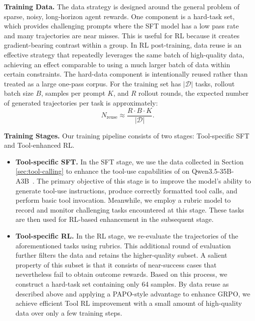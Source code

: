 \documentclass{llmxive}
\begin{document}
\textbf{Training Data.} The data strategy is designed around the general problem of sparse, noisy, long-horizon agent rewards. One component is a hard-task set, which provides challenging prompts where the SFT model has a low pass rate and many trajectories are near misses. This is useful for RL because it creates gradient-bearing contrast within a group. 
In RL post-training, data reuse is an effective strategy that repeatedly leverages the same batch of high-quality data, achieving an effect comparable to using a much larger batch of data within certain constraints. The hard-data component is intentionally reused rather than treated as a large one-pass corpus. For the training set has $|\mathcal{D}|$ tasks, rollout batch size $B$, samples per prompt $K$, and $R$ rollout rounds, the expected number of generated trajectories per task is approximately:
\begin{equation}
N_{\mathrm{reuse}}
\approx
\frac{R \cdot B \cdot K}{|\mathcal{D}|}.
\end{equation}

\textbf{Training Stages.} Our training pipeline consists of two stages: Tool-specific SFT and Tool-enhanced RL.
\begin{itemize}
    \item \textbf{Tool-specific SFT.} In the SFT stage, we use the data collected in Section \ref{sec:tool-calling} to enhance the tool-use capabilities of on Qwen3.5-35B-A3B~\citep{Qwen3.5}. The primary objective of this stage is to improve the model’s ability to generate tool-use instructions, produce correctly formatted tool calls, and perform basic tool invocation. Meanwhile, we employ a rubric model to record and monitor challenging tasks encountered at this stage. These tasks are then used for RL-based enhancement in the subsequent stage.
    \item \textbf{Tool-specific RL.} In the RL stage, we re-evaluate the trajectories of the aforementioned tasks using rubrics. This additional round of evaluation further filters the data and retains the higher-quality subset. A salient property of this subset is that it consists of near-success cases that nevertheless fail to obtain outcome rewards. Based on this process, we construct a hard-task set containing only 64 samples. By data reuse as described above and applying a PAPO-style advantage to enhance GRPO, we achieve efficient Tool RL improvement with a small amount of high-quality data over only a few training steps. 
\end{itemize}
\end{document}
